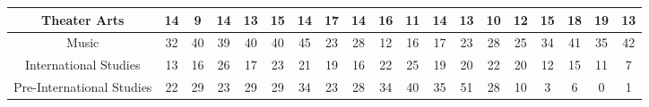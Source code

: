 \documentclass[10pt]{article}
\begin{document}
\begin{landscape}
\begin{longtable}[c]{|ccccccccccccccccccc|}
	\multicolumn{1}{|c|}{Theater Arts}                               & \multicolumn{1}{c|}{14}         & \multicolumn{1}{c|}{9}          & \multicolumn{1}{c|}{14}         & \multicolumn{1}{c|}{13}         & \multicolumn{1}{c|}{15}         & \multicolumn{1}{c|}{14}         & \multicolumn{1}{c|}{17}         & \multicolumn{1}{c|}{14}         & \multicolumn{1}{c|}{16}         & \multicolumn{1}{c|}{11}         & \multicolumn{1}{c|}{14}         & \multicolumn{1}{c|}{13}         & \multicolumn{1}{c|}{10}         & \multicolumn{1}{c|}{12}         & \multicolumn{1}{c|}{15}         & \multicolumn{1}{c|}{18}         & \multicolumn{1}{c|}{19}         & 13         \\ \hline
	\multicolumn{1}{|c|}{Music}                                      & \multicolumn{1}{c|}{32}         & \multicolumn{1}{c|}{40}         & \multicolumn{1}{c|}{39}         & \multicolumn{1}{c|}{40}         & \multicolumn{1}{c|}{40}         & \multicolumn{1}{c|}{45}         & \multicolumn{1}{c|}{23}         & \multicolumn{1}{c|}{28}         & \multicolumn{1}{c|}{12}         & \multicolumn{1}{c|}{16}         & \multicolumn{1}{c|}{17}         & \multicolumn{1}{c|}{23}         & \multicolumn{1}{c|}{28}         & \multicolumn{1}{c|}{25}         & \multicolumn{1}{c|}{34}         & \multicolumn{1}{c|}{41}         & \multicolumn{1}{c|}{35}         & 42         \\ \hline
	\multicolumn{1}{|c|}{International Studies}                      & \multicolumn{1}{c|}{13}         & \multicolumn{1}{c|}{16}         & \multicolumn{1}{c|}{26}         & \multicolumn{1}{c|}{17}         & \multicolumn{1}{c|}{23}         & \multicolumn{1}{c|}{21}         & \multicolumn{1}{c|}{19}         & \multicolumn{1}{c|}{16}         & \multicolumn{1}{c|}{22}         & \multicolumn{1}{c|}{25}         & \multicolumn{1}{c|}{19}         & \multicolumn{1}{c|}{20}         & \multicolumn{1}{c|}{22}         & \multicolumn{1}{c|}{20}         & \multicolumn{1}{c|}{12}         & \multicolumn{1}{c|}{15}         & \multicolumn{1}{c|}{11}         & 7          \\ \hline
	\multicolumn{1}{|c|}{Pre-International Studies}                  & \multicolumn{1}{c|}{22}         & \multicolumn{1}{c|}{29}         & \multicolumn{1}{c|}{23}         & \multicolumn{1}{c|}{29}         & \multicolumn{1}{c|}{29}         & \multicolumn{1}{c|}{34}         & \multicolumn{1}{c|}{23}         & \multicolumn{1}{c|}{28}         & \multicolumn{1}{c|}{34}         & \multicolumn{1}{c|}{40}         & \multicolumn{1}{c|}{35}         & \multicolumn{1}{c|}{51}         & \multicolumn{1}{c|}{28}         & \multicolumn{1}{c|}{10}         & \multicolumn{1}{c|}{3}          & \multicolumn{1}{c|}{6}          & \multicolumn{1}{c|}{0}          & 1          \\ \hline

\end{longtable}
\end{landscape}
\end{document}
